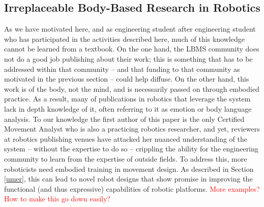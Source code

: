 \documentclass[arts,article,submit,moreauthors,pdftex,10pt,a4paper]{mdpi}
\begin{document}
\subsection{Irreplaceable Body-Based Research in Robotics}
As we have motivated here, and as engineering student after engineering student who has participated in the activities described here, much of this knowledge cannot be learned from a textbook.  On the one hand, the LBMS community does not do a good job publishing about their work; this is something that has to be addressed within that community -- and that funding to that community as motivated in the previous section -- could help diffuse.  On the other hand, this work is of the body, not the mind, and is necessarily passed on through embodied practice.  As a result, many of publications in robotics that leverage the system lack in depth knowledge of it, often referring to it as emotion or body language analysis. To our knowledge the first author of this paper is the only Certified Movement Analyst who is also a practicing robotics researcher, and yet, reviewers at robotics publishing venues have attacked her nuanced understanding of the system -- without the expertise to do so -- crippling the ability for the engineering community to learn from the expertise of outside fields.  To address this, more roboticists need embodied training in movement design. As described in Section \ref{umer}, this can lead to novel robot designs that show promise in improving the functional (and thus expressive) capabilities of robotic platforms.  \textcolor{red}{More examples?  How to make this go down easily?}


%
\end{document}
